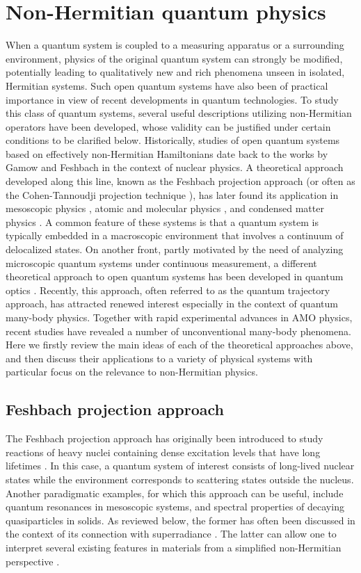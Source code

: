 \documentclass{tADP2e}
\theoremstyle{plain}
\theoremstyle{plain}
\theoremstyle{definition}
\begin{document}
\section{Non-Hermitian quantum physics\label{sec4}}
When a quantum system is coupled to a measuring apparatus or a surrounding environment, physics of the original quantum system can strongly be modified, potentially leading to qualitatively new and rich phenomena unseen in isolated, Hermitian systems. Such open quantum systems have  also been of practical importance in view of recent developments  in quantum technologies.  To study this class of quantum systems, several useful descriptions utilizing non-Hermitian operators have been developed, whose validity can be justified under certain conditions to be clarified below. Historically, studies of open quantum systems based on effectively non-Hermitian Hamiltonians date back to the works by Gamow \cite{GG28} and Feshbach \cite{HF58,HF62} in the context of nuclear physics. A theoretical approach developed along this line, known as the Feshbach projection approach (or often as the Cohen-Tannoudji projection technique \cite{CCT68}), has later found its application in mesoscopic physics \cite{AY00}, atomic and molecular physics \cite{SVV08}, and condensed matter physics \cite{DS95,IR09}. 
A common feature of these systems is that a quantum system is 
typically embedded in a macroscopic environment that involves a continuum of delocalized states. On another front, partly motivated by the need of analyzing microscopic quantum systems under continuous measurement, a different theoretical approach to open quantum systems has been developed in quantum optics \cite{MU89,UM90,DJ92,DR92,GCH92,HC93}. Recently, this approach, often referred to as the quantum trajectory approach, has attracted renewed interest especially in the context of quantum many-body physics. 
Together with rapid experimental advances in AMO physics, recent studies have revealed a number of unconventional many-body phenomena. Here we firstly review the main ideas of each of the theoretical approaches above, and then discuss their applications to a variety of physical systems with particular focus on the relevance to non-Hermitian physics.

\subsection{Feshbach projection approach\label{FP}}
The Feshbach projection approach has originally been introduced to study  reactions of heavy nuclei containing dense excitation levels that have long lifetimes \cite{HF58,HF62}. In this case, a quantum system of interest consists of long-lived nuclear states while the environment corresponds to scattering states outside the nucleus. Another paradigmatic examples, for which this approach can be useful, include quantum resonances in mesoscopic systems, and spectral properties of decaying quasiparticles in solids.  As reviewed below, the former has often been discussed in the context of its connection with superradiance \cite{DRH54}. The latter can allow one to interpret several existing features in materials from a simplified non-Hermitian perspective \cite{DS95,IR09}. 
\end{document}
